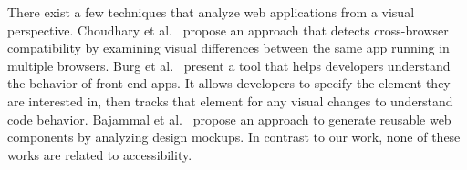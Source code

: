 There exist a few techniques that analyze web applications from a visual perspective.
Choudhary et al.~\cite{choudhary2012crosscheck} propose an approach that detects 
cross-browser compatibility by examining visual differences between the same app 
running in multiple browsers.
Burg et al.~\cite{burg2015explaining} present a tool that helps developers 
understand the behavior of front-end apps. It allows developers to specify 
the element they are interested in, then tracks that element for any 
visual changes to understand code behavior. 
Bajammal et al.~\cite{bajammal2018generating} propose an approach to generate reusable web 
components by analyzing design mockups.
In contrast to our work, none of these works are related to accessibility. 



